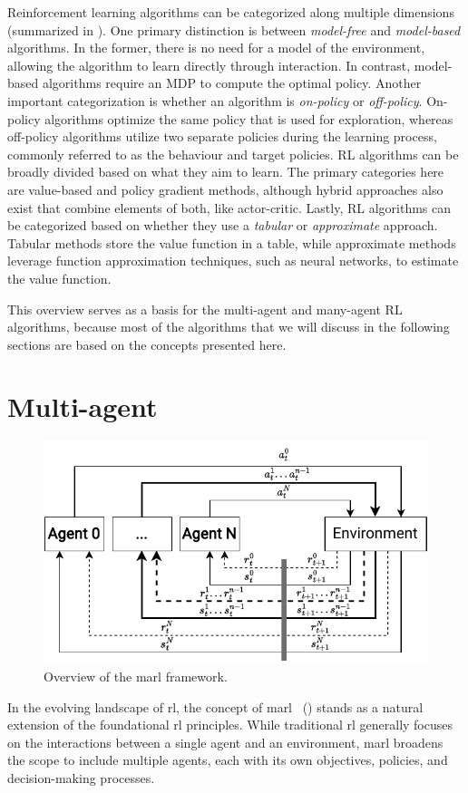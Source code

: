 Reinforcement learning algorithms can be categorized along multiple dimensions (summarized in ). 
 One primary distinction is between \emph{model-free} and \emph{model-based} algorithms. 
 In the former, there is no need for a model of the environment, allowing the algorithm to learn directly through interaction. 
 In contrast, model-based algorithms require an MDP to compute the optimal policy.
%
Another important categorization is whether an algorithm is \emph{on-policy} or \emph{off-policy}. 
 On-policy algorithms optimize the same policy that is used for exploration, 
 whereas off-policy algorithms utilize two separate policies during the learning process, commonly referred to as the behaviour and target policies.
%
RL algorithms can be broadly divided based on what they aim to learn. 
 The primary categories here are value-based and policy gradient methods, 
 although hybrid approaches also exist that combine elements of both, like actor-critic.
%
Lastly, RL algorithms can be categorized based on whether they use a \emph{tabular} or \emph{approximate} approach. 
 Tabular methods store the value function in a table, 
 while approximate methods leverage function approximation techniques, 
 such as neural networks, to estimate the value function.

This overview serves as a basis for the multi-agent and many-agent RL algorithms,
 because most of the algorithms that we will discuss in the following sections are based on the concepts presented here.

\section{Multi-agent}
\begin{figure}
\includegraphics[width=\textwidth]{chapters/img/multi-agent-rl.drawio.pdf}
\caption{Overview of the \ac{marl} framework.}\label{fig:marl:overview}
\end{figure}
In the evolving landscape of \ac{rl}, 
 the concept of \acf{marl}~\cite{DBLP:conf/icml/Tan93,DBLP:journals/corr/abs-2108-02731,DBLP:journals/corr/abs-1908-03963} () stands as a natural extension of the foundational \ac{rl} principles. 
 While traditional \ac{rl} generally focuses on the interactions between a single agent and an environment, 
 \ac{marl} broadens the scope to include multiple agents, 
 each with its own objectives, policies, and decision-making processes.


